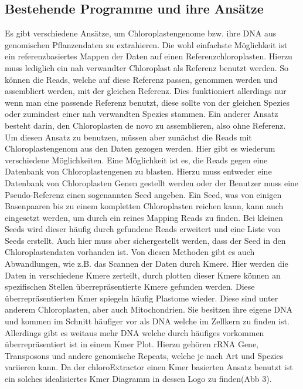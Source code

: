 \documentclass{scrartcl}
\begin{document}
\subsection{Bestehende Programme und ihre Ansätze}
\label{sec-2-5}
Es gibt verschiedene Ansätze, um Chloroplastengenome bzw. ihre DNA aus genomischen Pflanzendaten zu extrahieren. Die wohl einfachste Möglichkeit ist ein referenzbasiertes
Mappen der Daten auf einen Referenzchloroplasten. Hierzu muss lediglich ein nah verwandter Chloroplast als Referenz benutzt werden. So können die Reads, welche auf diese Referenz
passen, genommen werden und assembliert werden, mit der gleichen Referenz. Dies funktioniert allerdings nur wenn man eine passende Referenz benutzt, diese sollte von der gleichen Spezies oder
zumindest einer nah verwandten Spezies stammen. Ein anderer Ansatz besteht darin, den Chloroplasten de novo zu assemblieren, also ohne Referenz. Um diesen Ansatz zu benutzen, müssen
aber zunächst die Reads mit Chloroplastengenom aus den Daten gezogen werden. Hier gibt es wiederum verschiedene Möglichkeiten. Eine Möglichkeit ist es, die Reads gegen eine Datenbank
von Chloroplastengenen zu blasten. Hierzu muss entweder eine Datenbank von Chloroplasten Genen gestellt werden oder der Benutzer muss eine Pseudo-Referenz einen sogenannten Seed angeben.
Ein Seed, was von einigen Basenpaaren bis zu einem kompletten Chloroplasten reichen kann, kann auch eingesetzt werden, um durch ein reines Mapping Reads zu finden. Bei kleinen Seeds wird dieser
häufig durch gefundene Reads erweitert und eine Liste von Seeds erstellt. Auch hier muss aber sichergestellt werden, dass der Seed in den Chloroplastendaten vorhanden ist.
Von diesen Methoden gibt es auch Abwandlungen, wie z.B. das Scannen der Daten durch Kmere. Hier werden die Daten in verschiedene Kmere zerteilt, durch plotten dieser Kmere können
an spezifischen Stellen überrepräsentierte Kmere gefunden werden. Diese überrepräsentierten Kmer spiegeln häufig Plastome wieder. Diese sind unter anderem Chloroplasten, aber auch
Mitochondrien. Sie besitzen ihre eigene DNA und kommen im Schnitt häufiger vor als DNA welche im Zellkern zu finden ist. Allerdings gibt es weitaus mehr DNA welche durch häufiges vorkommen
überrepräsentiert ist in einem Kmer Plot. Hierzu gehören rRNA Gene, Transposons und andere genomische Repeats, welche je nach Art und Spezies variieren kann. 
Da der chloroExtractor einen Kmer basierten Ansatz benutzt ist ein solches idealisiertes Kmer Diagramm in dessen Logo zu finden(Abb 3).
\end{document}
